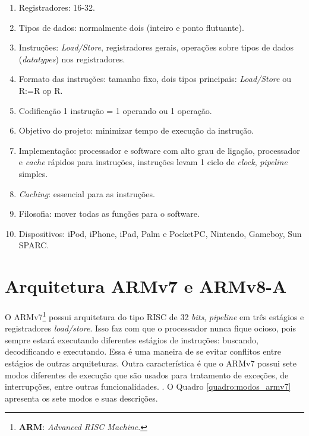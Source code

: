 \begin{enumerate} 
	\item Registradores: 16-32.
	
	\item Tipos de dados: normalmente dois (inteiro e ponto flutuante).
	
	\item Instruções: \textit{Load/Store}, registradores gerais, operações sobre tipos de dados (\textit{datatypes}) nos registradores.
	
	\item Formato das instruções: tamanho fixo, dois tipos principais: \textit{Load/Store} ou R:=R op R.
	
	\item Codificação 1 instrução = 1 operando ou 1 operação.
	
	\item Objetivo do projeto: minimizar tempo de execução da instrução.
	
	\item Implementação: processador e software com alto grau de ligação, processador e \textit{cache} rápidos para instruções, instruções levam 1 ciclo de \textit{clock}, \textit{pipeline} simples.
	
	\item \textit{Caching}: essencial para as instruções.
	
	\item Filosofia: mover todas as funções para o software.
	
	\item Dispositivos: iPod, iPhone, iPad, Palm e PocketPC, Nintendo, Gameboy, Sun SPARC.
\end{enumerate}

\section{Arquitetura ARMv7 e ARMv8-A}
\label{secao:arquitetura_arm7_arm8}

O ARMv7\footnote{\textbf{ARM}: \textit{Advanced RISC Machine}.} possui arquitetura do tipo RISC de 32 \textit{bits}, \textit{pipeline} em três estágios e registradores \textit{load/store}. Isso faz com que o processador nunca fique ocioso, pois sempre estará executando diferentes estágios de instruções: buscando, decodificando e executando. Essa é uma maneira de se evitar conflitos entre estágios de outras arquiteturas. Outra característica é que o ARMv7 possui sete modos diferentes de execução que são usados para tratamento de exceções, de interrupções, entre outras funcionalidades. \cite[p.~16]{cruz:2013:desenvolvimento}. O Quadro \ref{quadro:modos_armv7} apresenta os sete modos e suas descrições.

